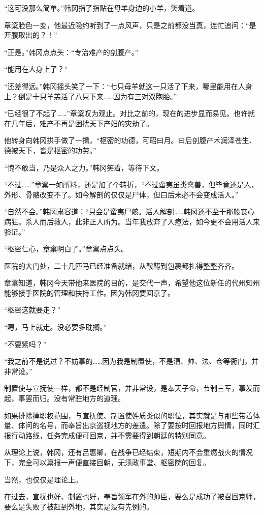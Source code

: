 “这可没那么简单。”韩冈指了指贴在母羊身边的小羊，笑着道。

章楶脸色一变，他最近隐约听到了一点风声，只是之前都没当真，连忙追问：“是开腹取出的？！”

“正是。”韩冈点点头：“专治难产的剖腹产。”

“能用在人身上了？”

“还差得远。”韩冈摇头笑了一下：“七只母羊就这一只活了下来，哪里能用在人身上？倒是十只羊羔活了八只下来……因为有三对双胞胎。”

“已经很了不起了……”章楶叹为观止。对比之前的，现在的进步显而易见。也许就在几年后，难产不再是困扰天下产妇的灾劫了。

他转身向韩冈拱手做了一揖，“枢密的功德，可昭曰月。曰后剖腹产术润泽苍生、德被天下，皆是枢密的功劳。”

“愧不敢当，乃是众人之力。”韩冈笑着，等待下文。

“不过……”章楶一如所料，还是加了个转折，“不过蛮夷虽类禽兽，但毕竟还是人，外形、骨骼改变不了。如今解剖的仅仅是尸体，但曰后未必不会变成活人。”

“自然不会。”韩冈肃容道：“只会是蛮夷尸骸。活人解剖……韩冈还不至于那般丧心病狂。杀人而后救人，此非正人所为。当年我放弃了人痘法，如今更不会用活人来验证。”

“枢密仁心，章楶明白了。”章楶点点头。

医院的大门处，二十几匹马已经准备就绪，从鞍鞯到包裹都扎得整整齐齐。

章楶知道，韩冈今天带他来医院的目的，是交代一声，希望他这位新任的代州知州能够接手医院的管理和扶持工作。因为韩冈要回京了。

“枢密这就要走？”

“嗯，马上就走。没必要多耽搁。”

“不要紧吗？”

“我之前不是说过？不妨事的……因为我是制置使，不是漕、帅、法、仓等衙门，并非常设。”

制置使与宣抚使一样，都不是经制官，并非常设，是奉天子命，节制三军，事发而起，事罢而归。没有常驻地方的道理。

如果排除掉职权范围，与宣抚使、制置使姓质类似的职位，其实就是与那些带着体量、体问的名号，而奉旨出京巡视地方的差遣。除了要按时回报地方舆情，同时汇报行动路线，任务完成便可回京，并不需要得到朝廷的特别同意。

从理论上说，韩冈，还有吕惠卿，在战争已经结束，短期内不会重燃战火的情况下，完全可以禀报一声便直接回朝，无须政事堂、枢密院的回复。

当然，也仅仅是理论上。

在过去，宣抚也好、制置也好，奉旨领军在外的帅臣，要么是成功了被召回京师，要么是失败了被赶到外地，其实是没有先例的。

